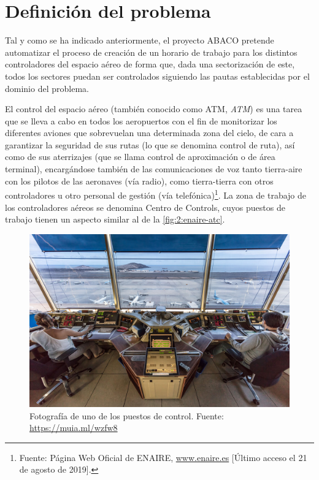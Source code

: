 \graphicspath{{capitulos/Capitulo2-Definicion-del-problema/recursos/}}


\section{Definición del problema} \label{capitulo:2}

Tal y como se ha indicado anteriormente, el proyecto ABACO pretende automatizar el proceso de creación de un horario de trabajo para los distintos controladores del espacio aéreo de forma que, dada una sectorización de este, todos los sectores puedan ser controlados siguiendo las pautas establecidas por el dominio del problema.

El control del espacio aéreo (también conocido como \gls{ATM}, \textit{\acrlong{ATM}}) es una tarea que se lleva a cabo en todos los aeropuertos con el fin de monitorizar los diferentes aviones que sobrevuelan una determinada zona del cielo, de cara a garantizar la seguridad de sus rutas (lo que se denomina control de ruta), así como de sus aterrizajes (que se llama control de aproximación o de área terminal), encargándose también de las comunicaciones de voz tanto tierra-aire con los pilotos de las aeronaves (vía radio), como tierra-tierra con otros controladores u otro personal de gestión (vía telefónica)\footnote{\label{ENAIRE-web}Fuente: Página Web Oficial de ENAIRE, \url{www.enaire.es} [Último acceso el 21 de agosto de 2019].}.
La zona de trabajo de los controladores aéreos se denomina \glspl{Centro de Control}, cuyos puestos de trabajo tienen un aspecto similar al de la \autoref{fig:2:enaire-atc}.

\begin{figure}[htbp]
    \centering
    \includegraphics[width=0.7\linewidth]{ENAIRE-ATC}
    \caption[Fotografía de uno de los puestos de control]{Fotografía de uno de los puestos de control. Fuente: 
    \url{https://muia.ml/wzfw8}}
    \label{fig:2:enaire-atc}
\end{figure}


